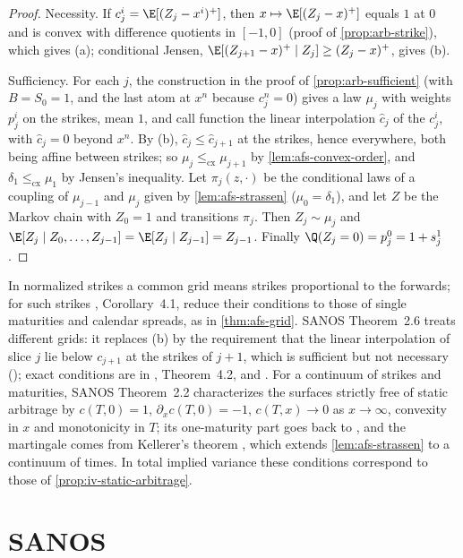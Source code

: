 \begin{proof}
Necessity. If $c_j^i=\E[(Z_j-x^i)^+]$, then $x\mapsto\E[(Z_j-x)^+]$ equals $1$ at $0$ and is convex with difference
quotients in $[-1,0]$ (proof of \cref{prop:arb-strike}), which gives (a); conditional Jensen,
$\E[(Z_{j+1}-x)^+\mid Z_j]\ge(Z_j-x)^+$, gives (b).

Sufficiency. For each $j$, the construction in the proof of \cref{prop:arb-sufficient} (with $B=S_0=1$, and the last
atom at $x^n$ because $c_j^n=0$) gives a law $\mu_j$ with weights $p_j^i$ on the strikes, mean $1$, and call function the
linear interpolation $\hat c_j$ of the $c_j^i$, with $\hat c_j=0$ beyond $x^n$. By (b), $\hat c_j\le\hat c_{j+1}$ at the strikes,
hence everywhere, both being affine between strikes; so $\mu_j\le_{\mathrm{cx}}\mu_{j+1}$ by \cref{lem:afs-convex-order}, and
$\delta_1\le_{\mathrm{cx}}\mu_1$ by Jensen's inequality. Let $\pi_j(z,\cdot)$ be the conditional laws of a coupling of
$\mu_{j-1}$ and $\mu_j$ given by \cref{lem:afs-strassen} ($\mu_0=\delta_1$), and let $Z$ be the Markov chain with $Z_0=1$
and transitions $\pi_j$. Then $Z_j\sim\mu_j$ and $\E[Z_j\mid Z_0,\dots,Z_{j-1}]=\E[Z_j\mid Z_{j-1}]=Z_{j-1}$. Finally
$\Q(Z_j=0)=p_j^0=1+s_j^1$.
\end{proof}

In normalized strikes a common grid means strikes proportional to the forwards; for such strikes
\textcite{davis-hobson}, Corollary~4.1, reduce their conditions to those of single maturities and calendar spreads, as in
\cref{thm:afs-grid}. SANOS Theorem~2.6 treats different grids: it
replaces (b) by the requirement that the linear interpolation of slice $j$ lie below $c_{j+1}$ at the strikes of
$j+1$, which is sufficient but not necessary (); exact conditions are in
\textcite{davis-hobson}, Theorem~4.2, and \textcite{cousot-2007}. For a continuum of strikes and maturities,
SANOS Theorem~2.2 characterizes the surfaces strictly free of static arbitrage by $c(T,0)=1$,
$\partial_xc(T,0)=-1$, $c(T,x)\to0$ as $x\to\infty$, convexity in $x$ and monotonicity in $T$; its one-maturity part goes back to
\textcite{buehler-expensive-2006}, and the martingale comes from Kellerer's theorem \citep{kellerer-1972}, which extends
\cref{lem:afs-strassen} to a continuum of times. In total implied variance these conditions correspond to those of
\cref{prop:iv-static-arbitrage}.

\section{SANOS}\label{sec:afs-sanos}

